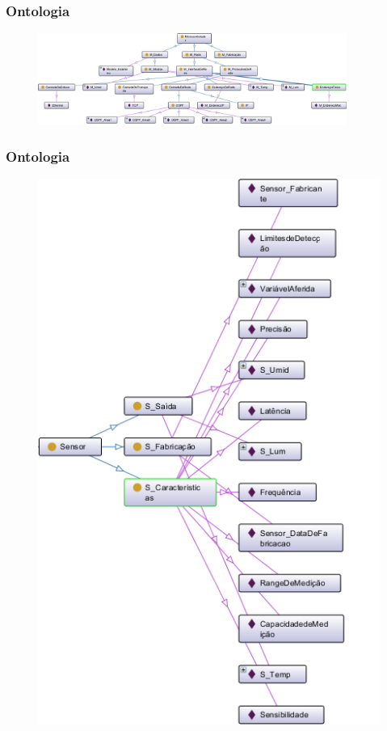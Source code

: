 
\begin{frame}
	\frametitle{Ontologia}
	
	\begin{figure}[h]
		\centering
		\includegraphics[width=0.9\textwidth]{"../Relatorio/Artigo IoT-G4/figs/Microcontrolador"}
		\label{topologia}
 	\end{figure}

\end{frame}


\begin{frame}
	\frametitle{Ontologia}
	
	\begin{figure}[h]
		\centering
		\includegraphics[scale=0.4]{"../Relatorio/Artigo IoT-G4/figs/Sensor"}
		\label{topologia}
 	\end{figure}

\end{frame}

